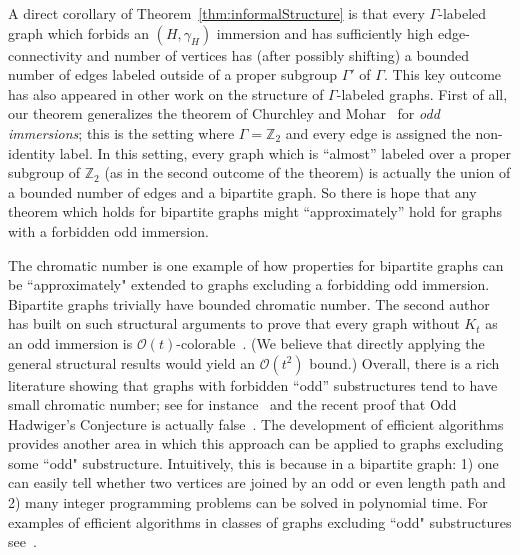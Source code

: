 \documentclass[11pt]{article}
\theoremstyle{definition}
\newcommand{\RM}[1]{\todo[linecolor=red,bordercolor=white,color=DeepCarrotOrange,backgroundcolor=BananaYellow!40,textcolor=DeepCarrotOrange,size=\footnotesize]{\textsf{RM: #1}}}
\newcommand{\RMin}[1]{\todo[inline,bordercolor=white,color=DeepCarrotOrange,backgroundcolor=BananaYellow!40,textcolor=DeepCarrotOrange,size=\footnotesize]{\textsf{RM: #1}}}
\newcommand{\CMin}[1]{\todo[inline,bordercolor=white,color=Magenta,backgroundcolor=CornflowerBlue!40,textcolor=black,size=\footnotesize]{\textsf{CM: #1}}}
\begin{document}

A direct corollary of Theorem~\ref{thm:informalStructure} is that every $\Gamma$-labeled graph which forbids an $(H, \gamma_H)$ immersion and has sufficiently high edge-connectivity and number of vertices has (after possibly shifting) a bounded number of edges labeled outside of a proper subgroup $\Gamma'$ of $\Gamma$. This key outcome has also appeared in other work on the structure of $\Gamma$-labeled graphs. First of all, our theorem generalizes the theorem of Churchley and Mohar~\cite{ChurchleyMohar2018} for \emph{odd immersions}; this is the setting where $\Gamma=\mathbb{Z}_2$ and every edge is assigned the non-identity label. In this setting, every graph which is ``almost'' labeled over a proper subgroup of $\mathbb{Z}_2$ (as in the second outcome of the theorem) is actually the union of a bounded number of edges and a bipartite graph. So there is hope that any theorem which holds for bipartite graphs might ``approximately'' hold for graphs with a forbidden odd immersion.


The chromatic number is one example of how properties for bipartite graphs can be ``approximately" extended to graphs excluding a forbidding odd immersion.  Bipartite graphs trivially have bounded chromatic number.  The second author has built on such structural arguments to prove that every graph without $K_t$ as an odd immersion is $\mathcal{O}(t)$-colorable~\cite{mcfarland2025}. (We believe that directly applying the general structural results would yield an $\mathcal{O}(t^2)$ bound.) Overall, there is a rich literature showing that graphs with forbidden ``odd'' substructures tend to have small chromatic number; see for instance~\cite{Geelen2009oddMinor, LiuOddSubdivisions, Steiner22, SteinerSubdivisions, ThomassenSubdivisions} and the recent proof that Odd Hadwiger's Conjecture is actually false~\cite{KSSW25}. The development of efficient algorithms provides another area in which this approach can be applied to graphs excluding some ``odd" substructure. Intuitively, this is because in a bipartite graph: 1) one can easily tell whether two vertices are joined by an odd or even length path and 2) many integer programming problems can be solved in polynomial time. For examples of efficient algorithms in classes of graphs excluding ``odd" substructures see~\cite{CGKMW2025, FJWY2025, HuynhThesis, KRW2011, LiuYoo25}.
\end{document}
